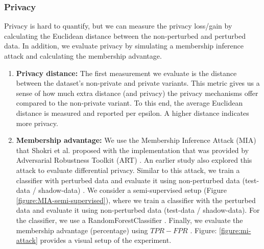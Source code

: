 \subsubsection{Privacy}
Privacy is hard to quantify, but we can measure the privacy loss/gain by calculating the Euclidean distance between the non-perturbed and perturbed data.
In addition, we evaluate privacy by simulating a membership inference attack and calculating the membership advantage.
\begin{enumerate}
    \item \textbf{Privacy distance: }
          The first measurement we evaluate is the distance between the dataset's non-private and private variants.
          This metric gives us a sense of how much extra distance (and privacy) the privacy mechanisms offer compared to the non-private variant.
          To this end, the average Euclidean distance is measured and reported per epsilon. A higher distance indicates more privacy.
    \item \textbf{Membership advantage: }
          We use the Membership Inference Attack (MIA) that Shokri et al. proposed with the implementation that was provided by Adversarial Robustness Toolkit (ART) \citep{nicolae_adversarial_2019}.
          An earlier study also explored this attack to evaluate differential privacy.
          Similar to this attack, we train a classifier with perturbed data and evaluate it using non-perturbed data (test-data / shadow-data) \citep{zhao_not_2020}.
          We consider a semi-supervised setup (Figure \ref{figure:MIA-semi-supervised}), where we train a classifier with the perturbed data and evaluate it using non-perturbed data (test-data / shadow-data).
          For the classifier, we use a RandomForestClassifier \citep{rigaki_survey_2021}.
          Finally, we evaluate the membership advantage (percentage) using $TPR - FPR$ \citep{yeom_privacy_2018}.
          Figure: \ref{figure:mi-attack} provides a visual setup of the experiment.


\end{enumerate}

